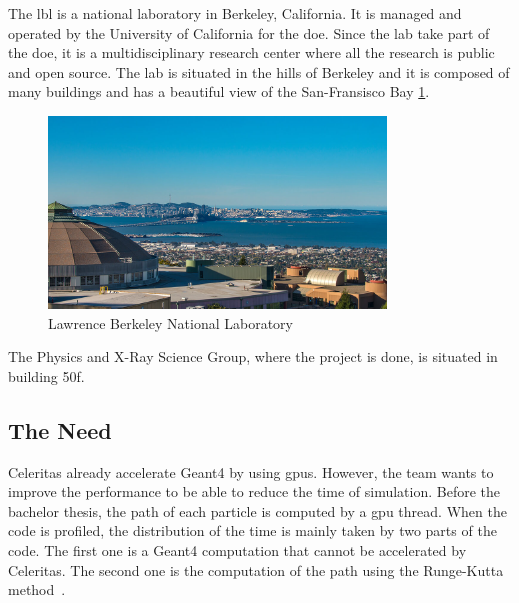 The \acrfull{lbl} is a national laboratory in Berkeley, California.
It is managed and operated by the University of California for the \acrfull{doe}.
Since the lab take part of the \acrshort{doe}, it is a multidisciplinary research center where all the research is public and open source.
The lab is situated in the hills of Berkeley and it is composed of many buildings and has a beautiful view of the San-Fransisco Bay \ref{spec:fig:context:lbl:lab-view}.

\begin{figure}[ht]
    \centering
    \includegraphics[width=0.8\textwidth]{05-resources/img/spec/lab-view.jpg}
    \caption{Lawrence Berkeley National Laboratory}
    \label{spec:fig:context:lbl:lab-view}
\end{figure}


The Physics and X-Ray Science Group, where the project is done, is situated in building 50f.


\subsection{The Need}
\label{spec:ch:context:celeritas:need}

Celeritas already accelerate Geant4 by using \acrshort{gpu}s.
However, the team wants to improve the performance to be able to reduce the time of simulation.
Before the bachelor thesis, the path of each particle is computed by a \acrshort{gpu} thread.
When the code is profiled, the distribution of the time is mainly taken by two parts of the code.
The first one is a Geant4 computation that cannot be accelerated by Celeritas.
The second one is the computation of the path using the Runge-Kutta method~\cite{Runge-Kutta-methods}.

